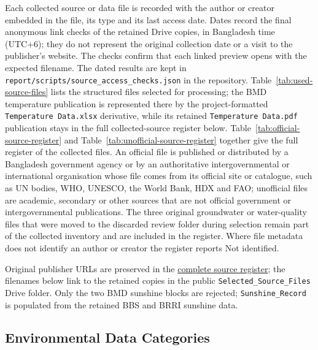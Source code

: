 Each collected source or data file is recorded with the author or creator
embedded in the file, its type and its last access date. Dates record the
final anonymous link checks of the retained Drive copies, in Bangladesh time
(UTC+6); they do not represent the original collection date or a visit to the
publisher's website. The checks confirm that each linked preview opens with
the expected filename. The dated results are kept in
\texttt{report/scripts/source\_access\_checks.json} in the repository.
Table~\ref{tab:used-source-files} lists the
\mSourceFiles{} structured files selected for processing; the BMD temperature
publication is represented there by the project-formatted
\texttt{Temperature Data.xlsx} derivative, while its retained
\texttt{Temperature Data.pdf} publication stays in the full collected-source
register below. Table~\ref{tab:official-source-register} and
Table~\ref{tab:unofficial-source-register} together give the full register of
the \mSourceDataFiles{} collected files. An official file is published or
distributed by a Bangladesh government agency or by an authoritative
intergovernmental or international organisation whose file comes from its
official site or catalogue, such as UN bodies, WHO, UNESCO, the World Bank,
HDX and FAO; unofficial files are academic, secondary or other sources that
are not official government or intergovernmental publications. The three
original groundwater or water-quality files that were moved to the discarded
review folder during selection remain part of the collected inventory and are
included in the register. Where file metadata does not identify an author or
creator the register reports Not identified.

Original publisher URLs are preserved in the
\href{https://drive.google.com/file/d/1UB5vrVxfrtvFXZUDgvV4bsBDaMcvC2sw/view}
{complete source register}; the filenames below link to the retained copies in
the public \texttt{Selected\_Source\_Files} Drive folder. Only the two BMD
sunshine blocks are rejected; \texttt{Sunshine\_Record} is populated from the
retained BBS and BRRI sunshine data.







\subsection{Environmental Data Categories}
\label{subsec:data-categories}

